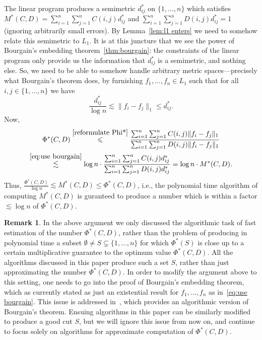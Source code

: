 \documentclass{icm2010}
\theoremstyle{definition}
\newcommand{\1}{\mathbf{1}}
\renewcommand{\le}{\leqslant}
\newtheorem{rem}[theorem]{Remark}
\begin{document}
The linear program produces a semimetric $d_{ij}^*$ on
$\{1,\ldots,n\}$ which satisfies
$M^*(C,D)=\sum_{i=1}^n\sum_{j=1}^nC(i,j)d^*_{ij}$ and
$\sum_{i=1}^n\sum_{j=1}^n D(i,j)d^*_{ij}=1$ (ignoring arbitrarily
small errors). By Lemma~\ref{lem:l1 enters} we need to somehow
relate this semimetric to $L_1$. It is at this juncture that we see
the power of Bourgain's embedding theorem~\ref{thm:bourgain}: the
constraints of the linear program only provide us the information that
$d_{ij}^*$ is a semimetric, and nothing else. So, we need to be able
to somehow handle arbitrary metric spaces---precisely what
Bourgain's theorem does, by furnishing $f_1,\ldots,f_n\in L_1$ such
that for all $i,j\in \{1,\ldots,n\}$ we have
\begin{equation}\label{eq:use bourgain}
\frac{d_{ij}^*}{\log n}\lesssim \|f_i-f_j\|_1\le d_{ij}^*.
\end{equation}
Now,
\begin{multline}\label{eq:deduce from 14}
 \Phi^*(C,D)\stackrel{\eqref{reformulate Phi*}}{\le}
\frac{\sum_{i=1}^n\sum_{j=1}^n C(i,j) \|f_i-f_j\|_1}
               {\sum_{i=1}^n\sum_{j=1}^n D(i,j)\|f_i-f_j\|_1}
              \\ \stackrel{\eqref{eq:use bourgain}}{\lesssim} \log n\cdot \frac{\sum_{i=1}^n\sum_{j=1}^n C(i,j) d_{ij}^*}
               {\sum_{i=1}^n\sum_{j=1}^n D(i,j)d_{ij}^*}=\log
               n\cdot M^*(C,D).
\end{multline}
Thus, $\frac{\Phi^*(C,D)}{\log n}\lesssim M^*(C,D)\le \Phi^*(C,D)$,
i.e., the polynomial time algorithm of computing $M^*(C,D)$ is
guranteed to produce a number which is within a factor $\lesssim
\log n$ of $\Phi^*(C,D)$.

\begin{rem}\label{rem:the cut}
In the above argument we only discussed the algorithmic task of fast
estimation of the number $\Phi^*(C,D)$, rather than the problem of
producing in polynomial time a subset $\emptyset\neq S\subsetneq
\{1,\ldots,n\}$ for which $\Phi^*(S)$ is close up to a certain
multiplicative guarantee to the optimum value $\Phi^*(C,D)$. All the
algorithms discussed in this paper produce such a set $S$, rather than
just approximating the number $\Phi^*(C,D)$. In order to modify the
argument above to this setting, one needs to go into the proof of
Bourgain's embedding theorem, which as currently stated as just an existential
result for $f_1,\ldots,f_n$ as in~\eqref{eq:use bourgain}. This
issue is addressed in~\cite{LLR95}, which provides an algorithmic
version of Bourgain's theorem. Ensuing algorithms in this paper can
be similarly modified to produce a good cut $S$, but we will ignore
this issue from now on, and continue to focus solely on algorithms
for approximate computation of $\Phi^*(C,D)$.
\end{rem}
\end{document}
